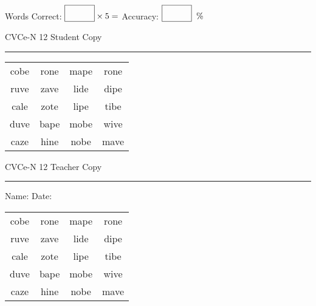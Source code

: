 \documentclass{memoir}
\begin{document}
\small

Words Correct: $\fbox{\phantom{\huge 100}} \times 5 = $ Accuracy: $\fbox{\phantom{\huge 100}}\;\; \%$ 

\vfill

\newpage


\footnotesize \noindent
CVCe-N 12 \hfill Student Copy
\smallskip
\hrule

\Large

\setlength{\tabcolsep}{14pt}
\def\arraystretch{2}

{\selectfont


\begin{vplace}[0.5]
\begin{center}
\begin{tabular}{cccc}
cobe & rone & mape & rone \\
ruve & zave & lide & dipe \\
cale & zote & lipe & tibe \\
duve & bape & mobe & wive \\
caze & hine & nobe & mave \\
\end{tabular}
\end{center}
\end{vplace}

}

\newpage

\footnotesize \noindent
CVCe-N 12 \hfill Teacher Copy
\smallskip
\hrule

\small

\vfill

\noindent
Name: \underline{\hspace{1.75in}} \hfill Date: \underline{\hspace{1in}}

\Large

{\selectfont


\begin{vplace}[0.5]
\begin{center}
\begin{tabular}{cccc}
cobe & rone & mape & rone \\
ruve & zave & lide & dipe \\
cale & zote & lipe & tibe \\
duve & bape & mobe & wive \\
caze & hine & nobe & mave \\
\end{tabular}
\end{center}
\end{vplace}



}
\end{document}
